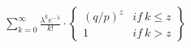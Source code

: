 \documentclass{article}
\begin{document}
\pagestyle{empty}

\begin{align*}
 \sum_{k = 0}^{\infty}
 \frac{\lambda^ke^{-\lambda}}{k!}
 \cdot
 \begin{Bmatrix}
  (q / p)^z & if \ k \leq z \\
  1         & if \ k > z    
 \end{Bmatrix}
\end{align*}
\end{document}
